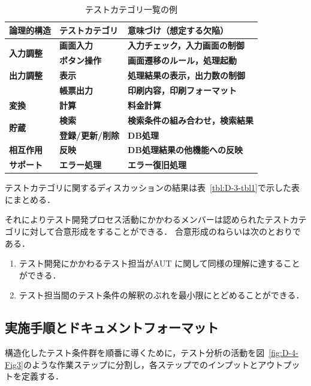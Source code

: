 \begin{table}[htbp]
  \centering
  \caption{テストカテゴリ一覧の例}
    \begin{tabular}{|p{6em}|p{8.07em}|p{14.645em}|}
    \hline
    \textbf{論理的構造} & \textbf{テストカテゴリ} & \textbf{意味づけ（想定する欠陥）} \bigstrut\\
    \hline
    \multirow{2}[4]{*}{\textbf{入力調整}} & \textbf{画面入力} & \textbf{入力チェック，入力画面の制御} \bigstrut\\
\cline{2-3}    \multicolumn{1}{|l|}{} & \textbf{ボタン操作} & \textbf{画面遷移のルール，処理起動} \bigstrut\\
    \hline
    \textbf{出力調整} & \textbf{表示} & \textbf{処理結果の表示，出力数の制御} \bigstrut\\
    \hline
    \multicolumn{1}{|r|}{} & \textbf{帳票出力} & \textbf{印刷内容，印刷フォーマット} \bigstrut\\
    \hline
    \textbf{変換} & \textbf{計算} & \textbf{料金計算} \bigstrut\\
    \hline
    \multirow{2}[4]{*}{\textbf{貯蔵}} & \textbf{検索} & \textbf{検索条件の組み合わせ，検索結果} \bigstrut\\
\cline{2-3}    \multicolumn{1}{|l|}{} & \textbf{登録/更新/削除} & \textbf{DB処理} \bigstrut\\
    \hline
    \textbf{相互作用} & \textbf{反映} & \textbf{DB処理結果の他機能への反映} \bigstrut\\
    \hline
    \textbf{サポート} & \textbf{エラー処理} & \textbf{エラー復旧処理} \bigstrut\\
    \hline
    \end{tabular}%
  \label{tbl:D-4-tbl1}%
\end{table}


テストカテゴリに関するディスカッションの結果は表~\ref{tbl:D-3-tbl1}で示した表にまとめる．

それによりテスト開発プロセス活動にかかわるメンバーは認められたテストカテゴリに対して合意形成をすることができる．
合意形成のねらいは次のとおりである．

\begin{enumerate}
\item テスト開発にかかわるテスト担当がAUT に関して同様の理解に達することができる．
\item テスト担当間のテスト条件の解釈のぶれを最小限にとどめることができる．
\end{enumerate}


\subsection{実施手順とドキュメントフォーマット}
構造化したテスト条件群を順番に導くために，テスト分析の活動を図~\ref{fig:D-4-Fig3}のような作業ステップに分割し，各ステップでのインプットとアウトプットを定義する．


